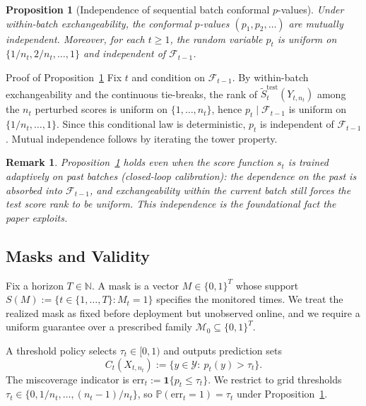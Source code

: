 \documentclass{uai2026} %
\newtheorem{proposition}[theorem]{Proposition}
\newtheorem*{remark}{Remark}
\newcommand{\N}{\mathbb{N}}
\newcommand{\1}{\mathbf{1}}
\newcommand{\ind}[1]{\mathbf{1}\{#1\}}
\newcommand{\prob}{\mathbb{P}}
\newcommand{\ycal}{\mathcal{Y}}
\newcommand{\F}{\mathcal{F}}
\newcommand{\mcal}{\mathcal{M}}
\begin{document}
\begin{proposition}[Independence of sequential batch conformal $p$-values]
  \label{prop:iid-pvalues}
  Under within-batch exchangeability, the conformal $p$-values $(p_1,p_2,\ldots)$ are mutually independent.
  Moreover, for each $t\ge 1$, the random variable $p_t$ is uniform on $\{1/n_t,2/n_t,\ldots,1\}$ and independent of $\F_{t-1}$.
\end{proposition}

\begin{appendixproof}{Proof of Proposition~\ref{prop:iid-pvalues}}
  Fix $t$ and condition on $\F_{t-1}$.
  By within-batch exchangeability and the continuous tie-breaks, the rank of $\tilde{S}_t^{\mathrm{test}}(Y_{t,n_t})$ among the $n_t$ perturbed scores is uniform on $\{1,\dots,n_t\}$, hence $p_t\mid \F_{t-1}$ is uniform on $\{1/n_t,\dots,1\}$.
  Since this conditional law is deterministic, $p_t$ is independent of $\F_{t-1}$.
  Mutual independence follows by iterating the tower property.
\end{appendixproof}

\begin{remark}
  Proposition~\ref{prop:iid-pvalues} holds even when the score function $s_t$ is trained adaptively on past batches (closed-loop calibration): the dependence on the past is absorbed into $\F_{t-1}$, and exchangeability within the current batch still forces the test score rank to be uniform.
  This independence is the foundational fact the paper exploits.
\end{remark}

\subsection{Masks and Validity}
\label{sec:masks}

Fix a horizon $T\in\N$.
A mask is a vector $M\in\{0,1\}^T$ whose support $S(M):=\{t\in\{1,\dots,T\}:M_t=1\}$ specifies the monitored times.
We treat the realized mask as fixed before deployment but unobserved online, and we require a uniform guarantee over a prescribed family $\mcal_0\subseteq\{0,1\}^T$.

A threshold policy selects $\tau_t\in[0,1)$ and outputs prediction sets
\begin{equation*}
  C_t(X_{t,n_t}):=\{y\in\ycal:\ p_t(y)>\tau_t\}.
\end{equation*}
The miscoverage indicator is $\mathrm{err}_t:=\ind{p_t\le\tau_t}$.
We restrict to grid thresholds $\tau_t\in\{0,1/n_t,\dots,(n_t-1)/n_t\}$, so $\prob(\mathrm{err}_t=1)=\tau_t$ under Proposition~\ref{prop:iid-pvalues}.
\end{document}
